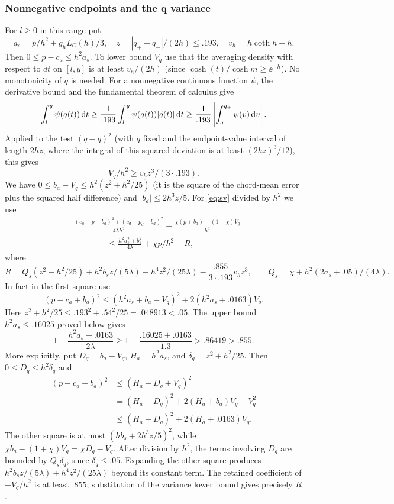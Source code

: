 \subsubsection{Nonnegative endpoints and the q variance}
For $l\ge0$ in this range put
\[
 a_s=p/h^2+g_h L_C(h)/3,\quad z=|q_+-q_-|/(2h)\le .193,\quad v_h=h\coth h-h.
\]
Then $0\le p-c_a\le h^2 a_s$. To lower bound $V_q$ use that the averaging density with respect to $dt$ on $[l,y]$ is at least $v_h/(2h)$ (since $\cosh(t)/\cosh m\ge \ee^{-h}$). No monotonicity of $q$ is needed. For a nonnegative continuous function $\psi$, the derivative bound and the fundamental theorem of calculus give
\[
 \int_l^y\psi(q(t))\,\mathrm{d} t
 \ge\frac1{.193}\int_l^y\psi(q(t))|\dot q(t)|\,\mathrm{d} t
 \ge\frac1{.193}\left|\int_{q_-}^{q_+}\psi(v)\,\mathrm{d} v\right|.
\]
Applied to the test $(q-\bar q)^2$ (with $\bar q$ fixed and the endpoint-value interval of length $2hz$, where the integral of this squared deviation is at least $(2hz)^3/12$), this gives
\[
 V_q/h^2\ge v_h z^3/(3\cdot .193).
\]
We have $0\le b_a-V_q\le h^2(z^2+h^2/25)$ (it is the square of the chord-mean error plus the squared half difference) and $|b_d|\le2h^3 z/5$. For \eqref{eq:sv} divided by $h^2$ we use
\[
 \begin{aligned}
 &\frac{(c_a-p-b_a)^2+(c_d-p_d-b_d)^2}{4\lambda h^2}
       +\frac{\chi(p+b_a)-(1+\chi)V_q}{h^2}\\
 &\qquad\qquad\le \frac{h^2 a_s^2+b_s^2}{4\lambda}+\chi p/h^2+R ,
 \end{aligned}
\]
where
\[
 R= Q_s(z^2+h^2/25)+h^2 b_s z/(5\lambda)+h^4 z^2/(25\lambda)
       -\frac{.855}{3\cdot .193}v_h z^3 ,
 \qquad Q_s=\chi+h^2(2a_s+.05)/(4\lambda).
\]
In fact in the first square use
\[
 (p-c_a+b_a)^2\le(h^2a_s+b_a-V_q)^2+2(h^2a_s+.0163)V_q .
\]
Here $z^2+h^2/25\le.193^2+.54^2/25=.048913<.05$. The upper bound $h^2a_s\le.16025$ proved below gives
\[
 1-\frac{h^2a_s+.0163}{2\lambda}
 \ge 1-\frac{.16025+.0163}{1.3}>.86419>.855.
\]
More explicitly, put $D_q=b_a-V_q$, $H_a=h^2a_s$, and $\delta_q=z^2+h^2/25$. Then $0\le D_q\le h^2\delta_q$ and
\[
\begin{aligned}
 (p-c_a+b_a)^2
 &\le(H_a+D_q+V_q)^2\\
 &=(H_a+D_q)^2+2(H_a+b_a)V_q-V_q^2\\
 &\le(H_a+D_q)^2+2(H_a+.0163)V_q.
\end{aligned}
\]
The other square is at most $(hb_s+2h^3z/5)^2$, while $\chi b_a-(1+\chi)V_q=\chi D_q-V_q$. After division by $h^2$, the terms involving $D_q$ are bounded by $Q_s\delta_q$, since $\delta_q\le.05$. Expanding the other square produces $h^2b_sz/(5\lambda)+h^4z^2/(25\lambda)$ beyond its constant term. The retained coefficient of $-V_q/h^2$ is at least $.855$; substitution of the variance lower bound gives precisely $R$.

